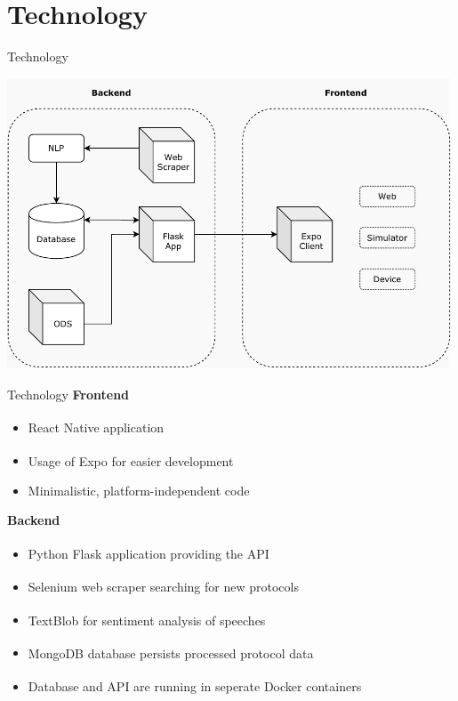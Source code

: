 \documentclass{beamer}
\newcounter{index}
\begin{document}
  \section{Technology}
  \begin{frame}[plain]{Technology}
    \begin{center}
      \includegraphics[width=0.99\textwidth]{fig/technology_overview.pdf}
    \end{center}
  \end{frame}

  \begin{frame}[plain]{Technology}
    \textbf{\faDesktop}\quad\textbf{Frontend}
    \begin{itemize}
      \item React Native\textsuperscript{\hyperlink{link-react-native}{}} application
      \item Usage of Expo\textsuperscript{\hyperlink{link-expo}{}} for easier development
      \item Minimalistic, platform-independent code
    \end{itemize}
    \textbf{\faServer}\quad\textbf{Backend}
    \begin{itemize}
      \item Python Flask\textsuperscript{\hyperlink{link-flask}{}} application providing the API
      \item Selenium\textsuperscript{\hyperlink{link-selenium}{}} web scraper searching for new protocols
      \item TextBlob\textsuperscript{\hyperlink{link-textblob}{}} for sentiment analysis of speeches
      \item MongoDB\textsuperscript{\hyperlink{link-mongodb}{}} database persists processed protocol data
      \item Database and API are running in seperate Docker\textsuperscript{\hyperlink{link-docker}{}} containers
    \end{itemize}
  \end{frame}
\end{document}
